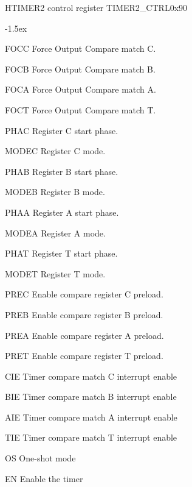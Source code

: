 \documentclass[12pt]{article}
\begin{document}
\begin{register}{H}{TIMER2 control register TIMER2\_CTRL}{0x90}
\label{timer2ctrl}
%
%
%
%
%
%
%
%
%
%
%
%
%
%
%
%
%
%
%
%
%
%
%
\regnewline%
\end{register}
\begin{regdesc}[0.8\textwidth]\begin{reglist}[000000]
\itemsep-1.5ex
\item [FOCC] Force Output Compare match C.
\item [FOCB] Force Output Compare match B.
\item [FOCA] Force Output Compare match A.
\item [FOCT] Force Output Compare match T.
\item [PHAC] Register C start phase.
\item[MODEC] Register C mode.
\item [PHAB] Register B start phase.
\item[MODEB] Register B mode.
\item [PHAA] Register A start phase.
\item[MODEA] Register A mode.
\item[PHAT] Register T start phase.
\item[MODET] Register T mode.
\item[PREC] Enable compare register C preload.
\item[PREB] Enable compare register B preload.
\item[PREA] Enable compare register A preload.
\item[PRET] Enable compare register T preload.
\item[CIE] Timer compare match C interrupt enable
\item[BIE] Timer compare match B interrupt enable
\item[AIE] Timer compare match A interrupt enable
\item[TIE] Timer compare match T interrupt enable
\item[OS] One-shot mode
\item[EN] Enable the timer
\end{reglist}\end{regdesc}
\end{document}

